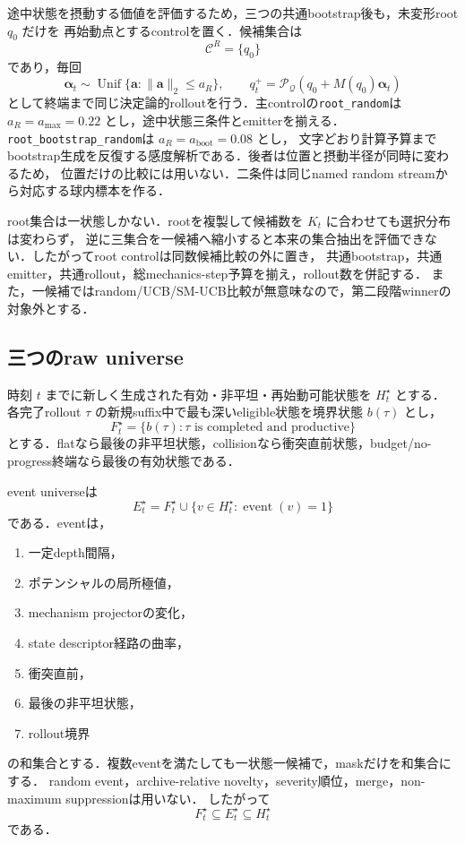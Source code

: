 \documentclass[a4paper,11pt]{ltjsarticle}
\newcommand{\code}[1]{\nolinkurl{#1}}
\begin{document}
途中状態を摂動する価値を評価するため，三つの共通bootstrap後も，未変形root \(q_0\) だけを
再始動点とするcontrolを置く．候補集合は
\begin{equation}
  \mathcal C^R=\{q_0\}
\end{equation}
であり，毎回
\begin{equation}
  \bm\alpha_t\sim\operatorname{Unif}
  \{\bm a:\|\bm a\|_2\le a_R\},
  \qquad
  q_t^+=\mathcal P_{\mathcal Q}
  (q_0+M(q_0)\bm\alpha_t)
  \label{eq:root-restart}
\end{equation}
として終端まで同じ決定論的rolloutを行う．主controlの\code{root\_random}は
\(a_R=a_{\max}=0.22\) とし，途中状態三条件とemitterを揃える．
\code{root\_bootstrap\_random}は \(a_R=a_{\mathrm{boot}}=0.08\) とし，
文字どおり計算予算までbootstrap生成を反復する感度解析である．後者は位置と摂動半径が同時に変わるため，
位置だけの比較には用いない．二条件は同じnamed random streamから対応する球内標本を作る．

root集合は一状態しかない．rootを複製して候補数を \(K_t\) に合わせても選択分布は変わらず，
逆に三集合を一候補へ縮小すると本来の集合抽出を評価できない．したがってroot controlは同数候補比較の外に置き，
共通bootstrap，共通emitter，共通rollout，総mechanics-step予算を揃え，rollout数を併記する．
また，一候補ではrandom/UCB/SM-UCB比較が無意味なので，第二段階winnerの対象外とする．

\subsection{三つのraw universe}

時刻 \(t\) までに新しく生成された有効・非平坦・再始動可能状態を \(H_t^\star\) とする．
各完了rollout \(\tau\) の新規suffix中で最も深いeligible状態を境界状態 \(b(\tau)\) とし，
\begin{equation}
  F_t^\star=\{b(\tau):\tau\text{ is completed and productive}\}
\end{equation}
とする．flatなら最後の非平坦状態，collisionなら衝突直前状態，budget/no-progress終端なら最後の有効状態である．

event universeは
\begin{equation}
  E_t^\star
  =F_t^\star
  \cup
  \{v\in H_t^\star:\operatorname{event}(v)=1\}
\end{equation}
である．eventは，
\begin{enumerate}
  \item 一定depth間隔，
  \item ポテンシャルの局所極値，
  \item mechanism projectorの変化，
  \item state descriptor経路の曲率，
  \item 衝突直前，
  \item 最後の非平坦状態，
  \item rollout境界
\end{enumerate}
の和集合とする．複数eventを満たしても一状態一候補で，maskだけを和集合にする．
random event，archive-relative novelty，severity順位，merge，non-maximum suppressionは用いない．
したがって
\begin{equation}
  F_t^\star\subseteq E_t^\star\subseteq H_t^\star
  \label{eq:nested-universes}
\end{equation}
である．
\end{document}
